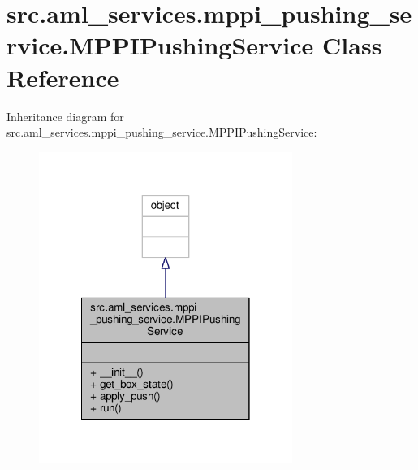 \hypertarget{classsrc_1_1aml__services_1_1mppi__pushing__service_1_1_m_p_p_i_pushing_service}{\section{src.\-aml\-\_\-services.\-mppi\-\_\-pushing\-\_\-service.\-M\-P\-P\-I\-Pushing\-Service Class Reference}
\label{classsrc_1_1aml__services_1_1mppi__pushing__service_1_1_m_p_p_i_pushing_service}
}


Inheritance diagram for src.\-aml\-\_\-services.\-mppi\-\_\-pushing\-\_\-service.\-M\-P\-P\-I\-Pushing\-Service\-:\nopagebreak
\begin{figure}[H]
\begin{center}
\leavevmode
\includegraphics[width=234pt]{classsrc_1_1aml__services_1_1mppi__pushing__service_1_1_m_p_p_i_pushing_service__inherit__graph}
\end{center}
\end{figure}



